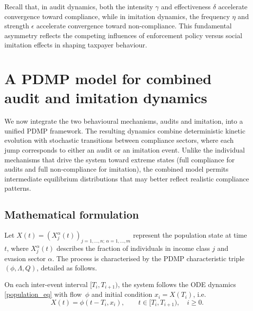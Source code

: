 \documentclass[11pt]{article}
\theoremstyle{plain}
\theoremstyle{definition}
\newcommand{\1}{\mathbf{1}}
\begin{document}
Recall that, in audit dynamics, both the intensity $\gamma$ and effectiveness $\delta$ accelerate convergence toward compliance, while in imitation dynamics, the frequency $\eta$ and strength $\epsilon$ accelerate convergence toward non-compliance. This fundamental asymmetry reflects the competing influences of enforcement policy versus social imitation effects in shaping taxpayer behaviour. 


\section{A PDMP model for combined audit and imitation dynamics}
\label{Combined_mod}

We now integrate the two behavioural mechanisms, audits and imitation, into a unified PDMP framework. The resulting dynamics combine deterministic kinetic evolution with stochastic transitions between compliance sectors, where each jump corresponds to either an audit or an imitation event. Unlike the individual mechanisms that drive the system toward extreme states (full compliance for audits and full non-compliance for imitation), the combined model permits intermediate equilibrium distributions that may better reflect realistic compliance patterns.

\subsection{Mathematical formulation}\label{sec:combined_PDMP}

Let $X(t) = (X_j^\alpha(t))_{j=1,\dots,n;\,\alpha=1,\dots,m}$ represent the population state at time $t$, where $X_j^\alpha(t)$ describes the fraction of individuals in income class $j$ and evasion sector $\alpha$. The process is characterised by the PDMP characteristic triple $(\phi, \Lambda, Q)$, detailed as follows. 

On each inter-event interval $[T_i,T_{i+1})$, the system follows the ODE dynamics \eqref{population_eq} with flow~$\phi$ and initial condition $x_i=X(T_i)$, i.e.
\begin{equation}\label{combined_flow}
    X(t)=\phi(t-T_i,x_i), \qquad t \in [T_i,T_{i+1}), \quad i\geq 0.
\end{equation}
\end{document}
